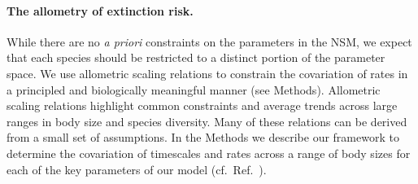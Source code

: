 \documentclass[twocolumn,preprintnumbers,amsmath,amssymb,superscriptaddress]{revtex4}
\begin{document}
\begin{bibunit}[unsrt]
  \noindent \paragraph*{{\bf The allometry of extinction risk.}} While there
  are no {\it a priori} constraints on the parameters in the NSM, we expect
  that each species should be restricted to a distinct portion of the parameter
  space.  We use allometric scaling relations to constrain the covariation of
  rates in a principled and biologically meaningful manner (see Methods).
  Allometric scaling relations highlight common constraints and average trends
  across large ranges in body size and species diversity. Many of these
  relations can be derived from a small set of assumptions.  In the Methods we
  describe our framework to determine the covariation of timescales and rates
  across a range of body sizes for each of the key parameters of our model
  (cf.\ Ref.~\citep{Yodzis:1992hg}).


\end{bibunit}
\end{document}
